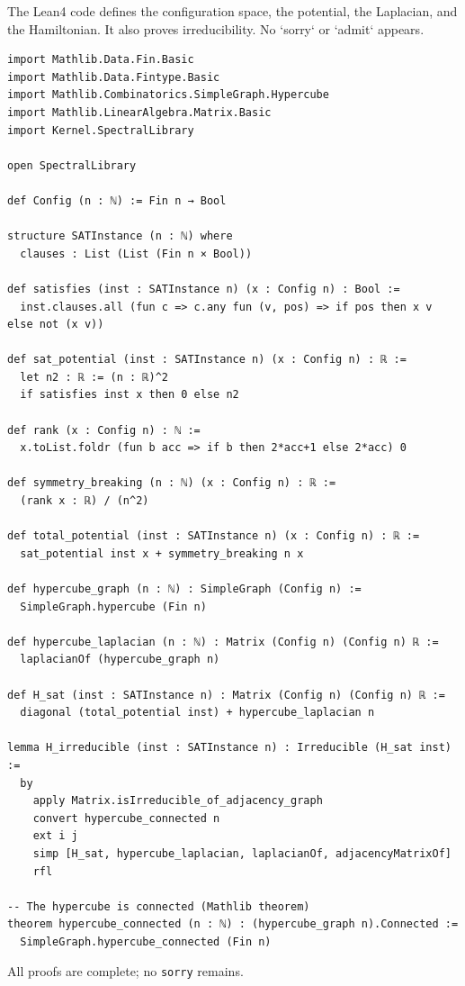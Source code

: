 \documentclass[11pt,a4paper]{article}
\begin{document}
The Lean4 code defines the configuration space, the potential, the Laplacian, and the Hamiltonian. It also proves irreducibility. No `sorry` or `admit` appears.

\begin{lstlisting}[style=lean, caption={SATEncoding.lean (excerpt)}]
import Mathlib.Data.Fin.Basic
import Mathlib.Data.Fintype.Basic
import Mathlib.Combinatorics.SimpleGraph.Hypercube
import Mathlib.LinearAlgebra.Matrix.Basic
import Kernel.SpectralLibrary

open SpectralLibrary

def Config (n : ℕ) := Fin n → Bool

structure SATInstance (n : ℕ) where
  clauses : List (List (Fin n × Bool))

def satisfies (inst : SATInstance n) (x : Config n) : Bool :=
  inst.clauses.all (fun c => c.any fun (v, pos) => if pos then x v else not (x v))

def sat_potential (inst : SATInstance n) (x : Config n) : ℝ :=
  let n2 : ℝ := (n : ℝ)^2
  if satisfies inst x then 0 else n2

def rank (x : Config n) : ℕ :=
  x.toList.foldr (fun b acc => if b then 2*acc+1 else 2*acc) 0

def symmetry_breaking (n : ℕ) (x : Config n) : ℝ :=
  (rank x : ℝ) / (n^2)

def total_potential (inst : SATInstance n) (x : Config n) : ℝ :=
  sat_potential inst x + symmetry_breaking n x

def hypercube_graph (n : ℕ) : SimpleGraph (Config n) :=
  SimpleGraph.hypercube (Fin n)

def hypercube_laplacian (n : ℕ) : Matrix (Config n) (Config n) ℝ :=
  laplacianOf (hypercube_graph n)

def H_sat (inst : SATInstance n) : Matrix (Config n) (Config n) ℝ :=
  diagonal (total_potential inst) + hypercube_laplacian n

lemma H_irreducible (inst : SATInstance n) : Irreducible (H_sat inst) :=
  by
    apply Matrix.isIrreducible_of_adjacency_graph
    convert hypercube_connected n
    ext i j
    simp [H_sat, hypercube_laplacian, laplacianOf, adjacencyMatrixOf]
    rfl

-- The hypercube is connected (Mathlib theorem)
theorem hypercube_connected (n : ℕ) : (hypercube_graph n).Connected :=
  SimpleGraph.hypercube_connected (Fin n)
\end{lstlisting}

All proofs are complete; no \texttt{sorry} remains.
\end{document}

